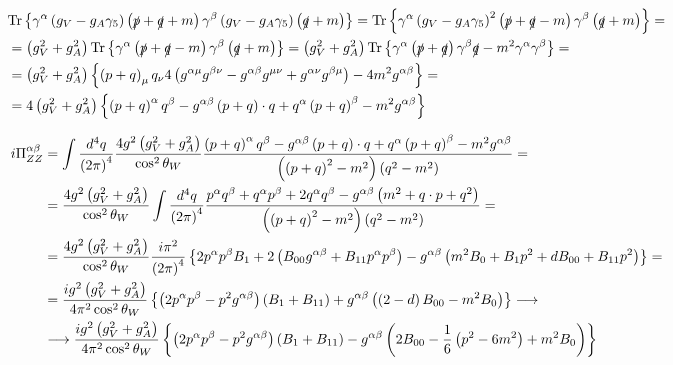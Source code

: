 \begin{align*}
& \mathrm{Tr} \left\lbrace \gamma^{\alpha} \left( g_V - g_A \gamma_5 \right) \left( \slashed{p}+\slashed{q}+m \right) \gamma^{\beta} \left( g_V - g_A \gamma_5 \right) \left( \slashed{q}+m \right) \right\rbrace = \mathrm{Tr} \left\lbrace \gamma^{\alpha} \left( g_V - g_A \gamma_5 \right)^2 \left( \slashed{p}+\slashed{q}-m \right) \gamma^{\beta} \left( \slashed{q}+m \right) \right\rbrace = & \\
& = \left( g_V^2 + g_A^2 \right) \mathrm{Tr} \left\lbrace \gamma^{\alpha} \left( \slashed{p} + \slashed{q} - m \right) \gamma^{\beta} \left( \slashed{q} + m \right) \right\rbrace = \left( g_V^2 + g_A^2 \right) \mathrm{Tr} \left\lbrace \gamma^{\alpha} \left( \slashed{p} + \slashed{q} \right) \gamma^{\beta} \slashed{q} - m^2 \gamma^{\alpha}\gamma^{\beta} \right\rbrace = & \\
& = \left( g_V^2 + g_A^2 \right) \left\lbrace \left( p+q \right)_{\mu} q_{\nu} 4 \left( g^{\alpha\mu}g^{\beta\nu} - g^{\alpha\beta}g^{\mu\nu} + g^{\alpha\nu}g^{\beta\mu} \right) - 4m^2 g^{\alpha\beta} \right\rbrace = & \\
& = 4 \left( g_V^2 + g_A^2 \right) \left\lbrace \left( p+q \right)^{\alpha}q^{\beta} - g^{\alpha\beta} \left( p+q \right) \cdot q + q^{\alpha} \left( p+q \right)^{\beta} - m^2 g^{\alpha\beta} \right\rbrace &
\end{align*}

\begin{align*}
i\Pi^{\alpha\beta}_{ZZ} & = \int \frac{d^4q}{\left( 2\pi \right)^4} \frac{4g^2\left(g_V^2 + g_A^2 \right)}{\cos^2\theta_W} \frac{\left( p+q \right)^{\alpha}q^{\beta} - g^{\alpha\beta} \left( p+q \right) \cdot q + q^{\alpha} \left( p+q \right)^{\beta} - m^2 g^{\alpha\beta}}{\left( \left( p+q \right)^2 -m^2 \right) \left( q^2 - m^2 \right)} = & \\
& = \frac{4g^2\left(g_V^2 + g_A^2 \right)}{\cos^2\theta_W} \int \frac{d^4q}{\left( 2\pi \right)^4} \frac{p^{\alpha}q^{\beta}+q^{\alpha}p^{\beta}+2q^{\alpha}q^{\beta} - g^{\alpha\beta} \left( m^2 + q \cdot p + q^2 \right)}{\left( \left( p+q \right)^2 -m^2 \right) \left( q^2 - m^2 \right)} = & \\
& = \frac{4g^2\left(g_V^2 + g_A^2 \right)}{\cos^2\theta_W} \frac{i\pi^2}{\left( 2\pi \right)^4} \left\lbrace 2 p^{\alpha}p^{\beta} B_1 + 2 \left( B_{00} g^{\alpha\beta} + B_{11} p^{\alpha}p^{\beta} \right) - g^{\alpha\beta} \left( m^2 B_0 + B_1 p^2 + d B_{00} + B_{11} p^2 \right) \right\rbrace = & \\
& = \frac{ig^2\left(g_V^2 + g_A^2 \right)}{4\pi^2\cos^2\theta_W} \left\lbrace \left( 2p^{\alpha}p^{\beta} -p^2 g^{\alpha\beta} \right) \left( B_1 + B_{11} \right) + g^{\alpha\beta} \left( \left( 2-d \right) B_{00} - m^2 B_0  \right) \right\rbrace \longrightarrow & \\
& \longrightarrow \frac{ig^2\left(g_V^2 + g_A^2 \right)}{4\pi^2\cos^2\theta_W} \left\lbrace \left( 2p^{\alpha}p^{\beta} -p^2 g^{\alpha\beta} \right) \left( B_1 + B_{11} \right) - g^{\alpha\beta} \left( 2 B_{00} - \frac{1}{6} \left( p^2 - 6m^2 \right) + m^2 B_0  \right) \right\rbrace
\end{align*}


